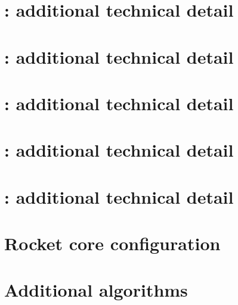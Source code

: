 \documentclass[preprint]{iacrtrans}
\begin{document}

\appendix

\clearpage
\section{: additional technical detail}
\label{sec:pseudo:v1}

\clearpage
\section{: additional technical detail}
\label{sec:pseudo:v2}

\clearpage
\section{: additional technical detail}
\label{sec:pseudo:v3}

\clearpage
\section{: additional technical detail}
\label{sec:pseudo:v4}

\clearpage
\section{: additional technical detail}
\label{sec:pseudo:v5}


\clearpage
\section{Rocket core configuration}
\label{sec:rocket:cfg}


\clearpage
\section{Additional algorithms}
\label{sec:alg}


\end{document}
